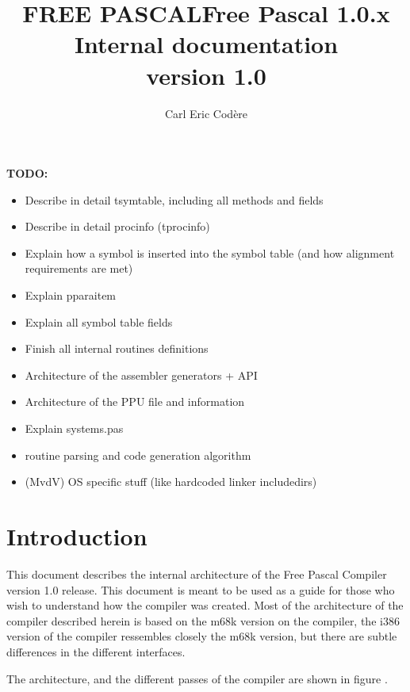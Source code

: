 \documentclass [a4paper,12pt]{article}
\title{FREE PASCAL}
\title{Free Pascal 1.0.x Internal documentation\\version 1.0}
\author{Carl Eric Cod\`{e}re}
\begin{document}
\maketitle
\tableofcontents
\newpage
\listoffigures
\newpage

\textbf{TODO:}
\begin{itemize}
\item Describe in detail tsymtable, including all methods and fields
\item Describe in detail procinfo (tprocinfo)
\item Explain how a symbol is inserted into the symbol table (and how alignment requirements are met)
\item Explain pparaitem
\item Explain all symbol table fields
\item Finish all internal routines definitions
\item Architecture of the assembler generators + API
\item Architecture of the PPU file and information
\item Explain systems.pas
\item routine parsing and code generation algorithm
\item (MvdV) OS specific stuff (like hardcoded linker includedirs)
\end{itemize}

\section{Introduction}
\label{sec:introductionappendix}

This document describes the internal architecture of the Free Pascal
Compiler version 1.0 release. This document is meant to be used as a guide
for those who wish to understand how the compiler was created. Most of the
architecture of the compiler described herein is based on the m68k version
on the compiler, the i386 version of the compiler ressembles closely the
m68k version, but there are subtle differences in the different interfaces.

The architecture, and the different passes of the compiler are shown in
figure .
\end{document}
